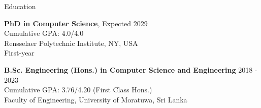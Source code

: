 \documentclass{resume} %
\begin{document}

\begin{rSection}{Education}

{\bf PhD in Computer Science}, \hfill {Expected 2029}\\
Cumulative GPA: 4.0/4.0 \\
Rensselaer Polytechnic Institute, NY, USA \\
First-year 

{\bf B.Sc. Engineering (Hons.) in Computer Science and Engineering} \hfill {2018 - 2023}\\
Cumulative GPA: 3.76/4.20 (First Class Hons.) \\
Faculty of Engineering,
University of Moratuwa, Sri Lanka 
\end{rSection}



\end{document}
